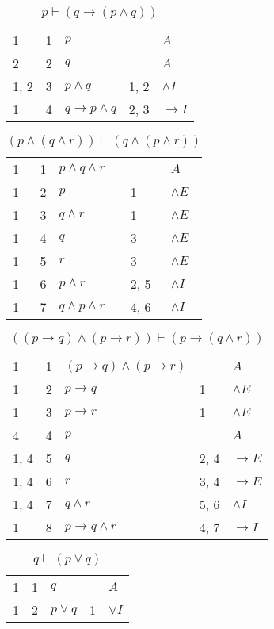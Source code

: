 \documentclass{article}
\begin{document}
\begin{table}[htbp]\caption*{$p ⊢ (q→(p∧q))$}\centering\begin{tabular}{lrlll}
{1} & 1 & $p$ & {} & $A$ \\
{2} & 2 & $q$ & {} & $A$ \\
{1, 2} & 3 & $p∧q$ & {1, 2} & $∧I$ \\
{1} & 4 & $q→p∧q$ & {2, 3} & $→I$ \\
\end{tabular}
\end{table}
\begin{table}[htbp]\caption*{$(p∧(q∧r)) ⊢ (q∧(p∧r))$}\centering\begin{tabular}{lrlll}
{1} & 1 & $p∧q∧r$ & {} & $A$ \\
{1} & 2 & $p$ & {1} & $∧E$ \\
{1} & 3 & $q∧r$ & {1} & $∧E$ \\
{1} & 4 & $q$ & {3} & $∧E$ \\
{1} & 5 & $r$ & {3} & $∧E$ \\
{1} & 6 & $p∧r$ & {2, 5} & $∧I$ \\
{1} & 7 & $q∧p∧r$ & {4, 6} & $∧I$ \\
\end{tabular}
\end{table}
\begin{table}[htbp]\caption*{$((p→q)∧(p→r)) ⊢ (p→(q∧r))$}\centering\begin{tabular}{lrlll}
{1} & 1 & $(p→q)∧(p→r)$ & {} & $A$ \\
{1} & 2 & $p→q$ & {1} & $∧E$ \\
{1} & 3 & $p→r$ & {1} & $∧E$ \\
{4} & 4 & $p$ & {} & $A$ \\
{1, 4} & 5 & $q$ & {2, 4} & $→E$ \\
{1, 4} & 6 & $r$ & {3, 4} & $→E$ \\
{1, 4} & 7 & $q∧r$ & {5, 6} & $∧I$ \\
{1} & 8 & $p→q∧r$ & {4, 7} & $→I$ \\
\end{tabular}
\end{table}
\begin{table}[htbp]\caption*{$q ⊢ (p∨q)$}\centering\begin{tabular}{lrlll}
{1} & 1 & $q$ & {} & $A$ \\
{1} & 2 & $p∨q$ & {1} & $∨I$ \\
\end{tabular}
\end{table}
\end{document}
